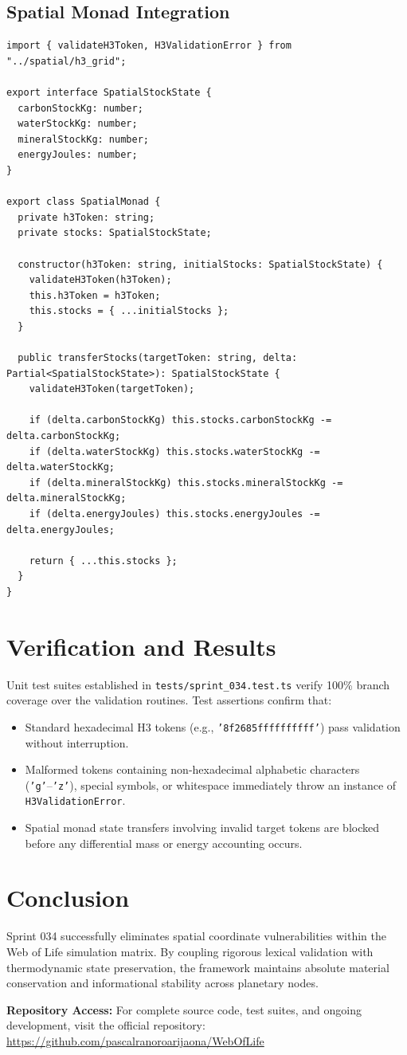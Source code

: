 \documentclass[11pt, a4paper]{article}
\begin{document}
\subsection{Spatial Monad Integration}
\begin{lstlisting}
import { validateH3Token, H3ValidationError } from "../spatial/h3_grid";

export interface SpatialStockState {
  carbonStockKg: number;
  waterStockKg: number;
  mineralStockKg: number;
  energyJoules: number;
}

export class SpatialMonad {
  private h3Token: string;
  private stocks: SpatialStockState;

  constructor(h3Token: string, initialStocks: SpatialStockState) {
    validateH3Token(h3Token);
    this.h3Token = h3Token;
    this.stocks = { ...initialStocks };
  }

  public transferStocks(targetToken: string, delta: Partial<SpatialStockState>): SpatialStockState {
    validateH3Token(targetToken);
    
    if (delta.carbonStockKg) this.stocks.carbonStockKg -= delta.carbonStockKg;
    if (delta.waterStockKg) this.stocks.waterStockKg -= delta.waterStockKg;
    if (delta.mineralStockKg) this.stocks.mineralStockKg -= delta.mineralStockKg;
    if (delta.energyJoules) this.stocks.energyJoules -= delta.energyJoules;

    return { ...this.stocks };
  }
}
\end{lstlisting}

\section{Verification and Results}
Unit test suites established in \texttt{tests/sprint\_034.test.ts} verify 100\% branch coverage over the validation routines. Test assertions confirm that:
\begin{itemize}
    \item Standard hexadecimal H3 tokens (e.g., \texttt{'8f2685ffffffffff'}) pass validation without interruption.
    \item Malformed tokens containing non-hexadecimal alphabetic characters (\texttt{'g'}--\texttt{'z'}), special symbols, or whitespace immediately throw an instance of \texttt{H3ValidationError}.
    \item Spatial monad state transfers involving invalid target tokens are blocked before any differential mass or energy accounting occurs.
\end{itemize}

\section{Conclusion}
Sprint 034 successfully eliminates spatial coordinate vulnerabilities within the Web of Life simulation matrix. By coupling rigorous lexical validation with thermodynamic state preservation, the framework maintains absolute material conservation and informational stability across planetary nodes.

\vspace{1em}
\noindent\textbf{Repository Access:} For complete source code, test suites, and ongoing development, visit the official repository: \url{https://github.com/pascalranoroarijaona/WebOfLife}
\end{document}
